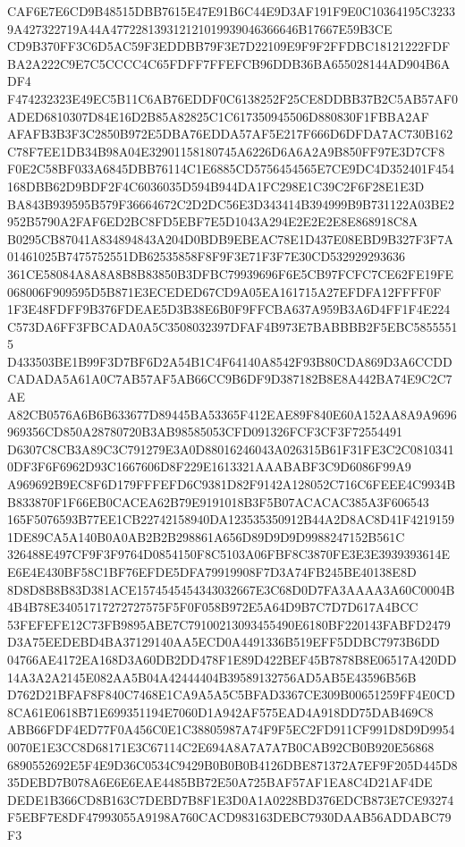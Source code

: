 \documentclass[UTF8,fontset=fandol,zihao=-4,a4paper]{ctexart}
\begin{document}
{{CAF6E7E6CD9B48515DBB7615E47E91B6C44E9D3AF191F9E0C10364195C32339A427322719A44A477228139312121019939046366646B17667E59B3CE
CD9B370FF3C6D5AC59F3EDDBB79F3E7D22109E9F9F2FFDBC18121222FDFBA2A222C9E7C5CCCC4C65FDFF7FFEFCB96DDB36BA655028144AD904B6ADF4
F474232323E49EC5B11C6AB76EDDF0C6138252F25CE8DDBB37B2C5AB57AF0ADED6810307D84E16D2B85A82825C1C617350945506D880830F1FBBA2AF
AFAFB3B3F3C2850B972E5DBA76EDDA57AF5E217F666D6DFDA7AC730B162C78F7EE1DB34B98A04E32901158180745A6226D6A6A2A9B850FF97E3D7CF8
F0E2C58BF033A6845DBB76114C1E6885CD5756454565E7CE9DC4D352401F454168DBB62D9BDF2F4C6036035D594B944DA1FC298E1C39C2F6F28E1E3D
BA843B939595B579F36664672C2D2DC56E3D343414B394999B9B731122A03BE2952B5790A2FAF6ED2BC8FD5EBF7E5D1043A294E2E2E2E8E868918C8A
B0295CB87041A834894843A204D0BDB9EBEAC78E1D437E08EBD9B327F3F7A01461025B7475752551DB62535858F8F9F3E71F3F7E30CD532929293636
361CE58084A8A8A8B8B83850B3DFBC79939696F6E5CB97FCFC7CE62FE19FE068006F909595D5B871E3ECEDED67CD9A05EA161715A27EFDFA12FFFF0F
1F3E48FDFF9B376FDEAE5D3B38E6B0F9FFCBA637A959B3A6D4FF1F4E224C573DA6FF3FBCADA0A5C3508032397DFAF4B973E7BABBBB2F5EBC58555515
D433503BE1B99F3D7BF6D2A54B1C4F64140A8542F93B80CDA869D3A6CCDDCADADA5A61A0C7AB57AF5AB66CC9B6DF9D387182B8E8A442BA74E9C2C7AE
A82CB0576A6B6B633677D89445BA53365F412EAE89F840E60A152AA8A9A9696969356CD850A28780720B3AB98585053CFD091326FCF3CF3F72554491
D6307C8CB3A89C3C791279E3A0D88016246043A026315B61F31FE3C2C08103410DF3F6F6962D93C1667606D8F229E1613321AAABABF3C9D6086F99A9
A969692B9EC8F6D179FFFEFD6C9381D82F9142A128052C716C6FEEE4C9934BB833870F1F66EB0CACEA62B79E9191018B3F5B07ACACAC385A3F606543
165F5076593B77EE1CB22742158940DA123535350912B44A2D8AC8D41F42191591DE89CA5A140B0A0AB2B2B298861A656D89D9D9D9988247152B561C
326488E497CF9F3F9764D0854150F8C5103A06FBF8C3870FE3E3E3939393614EE6E4E430BF58C1BF76EFDE5DFA79919908F7D3A74FB245BE40138E8D
8D8D8B8B83D381ACE1574545454343032667E3C68D0D7FA3AAAA3A60C0004B4B4B78E34051717272727575F5F0F058B972E5A64D9B7C7D7D617A4BCC
53FEFEFE12C73FB9895ABE7C79100213093455490E6180BF220143FABFD2479D3A75EEDEBD4BA37129140AA5ECD0A4491336B519EFF5DDBC7973B6DD
04766AE4172EA168D3A60DB2DD478F1E89D422BEF45B7878B8E06517A420DD14A3A2A2145E082AA5B04A42444404B39589132756AD5AB5E43596B56B
D762D21BFAF8F840C7468E1CA9A5A5C5BFAD3367CE309B00651259FF4E0CD8CA61E0618B71E699351194E7060D1A942AF575EAD4A918DD75DAB469C8
ABB66FDF4ED77F0A456C0E1C38805987A74F9F5EC2FD911CF991D8D9D99540070E1E3CC8D68171E3C67114C2E694A8A7A7A7B0CAB92CB0B920E56868
6890552692E5F4E9D36C0534C9429B0B0B0B4126DBE871372A7EF9F205D445D835DEBD7B078A6E6E6EAE4485BB72E50A725BAF57AF1EA8C4D21AF4DE
DEDE1B366CD8B163C7DEBD7B8F1E3D0A1A0228BD376EDCB873E7CE93274F5EBF7E8DF47993055A9198A760CACD983163DEBC7930DAAB56ADDABC79F3
}}
\end{document}
